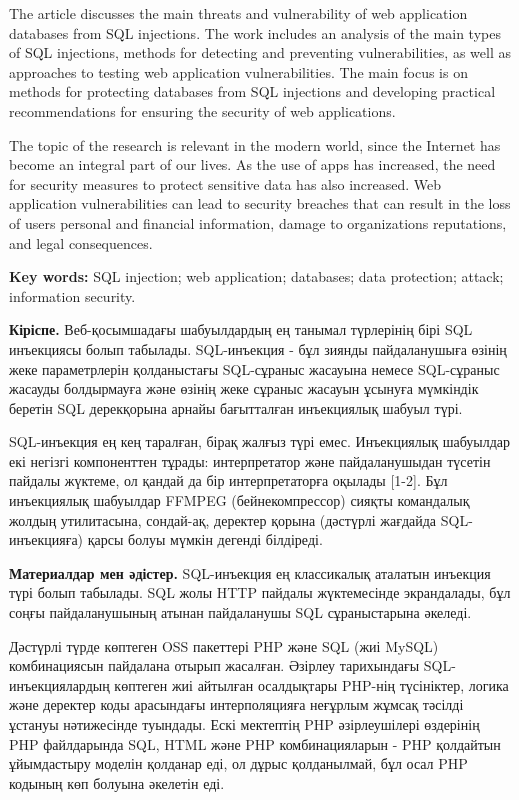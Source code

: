The article discusses the main threats and vulnerability of web
application databases from SQL injections. The work includes an analysis
of the main types of SQL injections, methods for detecting and
preventing vulnerabilities, as well as approaches to testing web
application vulnerabilities. The main focus is on methods for protecting
databases from SQL injections and developing practical recommendations
for ensuring the security of web applications.

The topic of the research is relevant in the modern world, since the
Internet has become an integral part of our lives. As the use of apps
has increased, the need for security measures to protect sensitive data
has also increased. Web application vulnerabilities can lead to security
breaches that can result in the loss of users\textquotesingle{} personal
and financial information, damage to organizations\textquotesingle{}
reputations, and legal consequences.

{\bfseries Key words:} SQL injection; web application; databases; data
protection; attack; information security.

{\bfseries Кіріспе.} Веб-қосымшадағы шабуылдардың ең танымал түрлерінің
бірі SQL инъекциясы болып табылады. SQL-инъекция - бұл зиянды
пайдаланушыға өзінің жеке параметрлерін қолданыстағы SQL-сұраныс
жасауына немесе SQL-сұраныс жасауды болдырмауға және өзінің жеке сұраныс
жасауын ұсынуға мүмкіндік беретін SQL дерекқорына арнайы бағытталған
инъекциялық шабуыл түрі.

SQL-инъекция ең кең таралған, бірақ жалғыз түрі емес. Инъекциялық
шабуылдар екі негізгі компоненттен тұрады: интерпретатор және
пайдаланушыдан түсетін пайдалы жүктеме, ол қандай да бір интерпретаторға
оқылады {[}1-2{]}. Бұл инъекциялық шабуылдар FFMPEG (бейнекомпрессор)
сияқты командалық жолдың утилитасына, сондай-ақ, деректер қорына
(дәстүрлі жағдайда SQL-инъекцияға) қарсы болуы мүмкін дегенді білдіреді.

{\bfseries Материалдар мен әдістер.} SQL-инъекция ең классикалық аталатын
инъекция түрі болып табылады. SQL жолы HTTP пайдалы жүктемесінде
экрандалады, бұл соңғы пайдаланушының атынан пайдаланушы SQL
сұраныстарына әкеледі.

Дәстүрлі түрде көптеген OSS пакеттері PHP және SQL (жиі MySQL)
комбинациясын пайдалана отырып жасалған. Әзірлеу тарихындағы
SQL-инъекциялардың көптеген жиі айтылған осалдықтары PHP-нің түсініктер,
логика және деректер коды арасындағы интерполяцияға неғұрлым жұмсақ
тәсілді ұстануы нәтижесінде туындады. Ескі мектептің PHP әзірлеушілері
өздерінің PHP файлдарында SQL, HTML және PHP комбинацияларын - PHP
қолдайтын ұйымдастыру моделін қолданар еді, ол дұрыс қолданылмай, бұл
осал PHP кодының көп болуына әкелетін еді.


